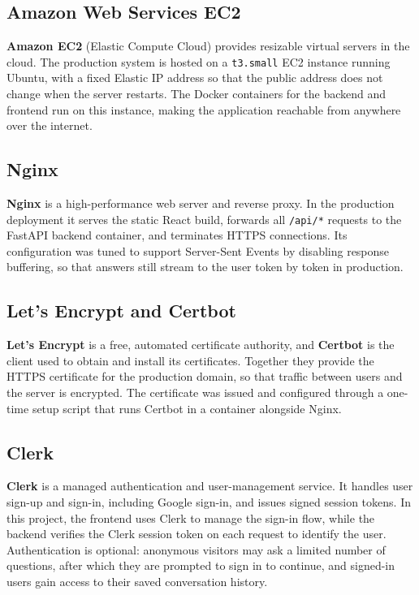 \subsection{Amazon Web Services EC2}
\textbf{Amazon EC2} (Elastic Compute Cloud) provides resizable virtual servers in the
cloud. The production system is hosted on a \texttt{t3.small} EC2 instance running Ubuntu,
with a fixed Elastic IP address so that the public address does not change when the server
restarts. The Docker containers for the backend and frontend run on this instance, making
the application reachable from anywhere over the internet.

\subsection{Nginx}
\textbf{Nginx} is a high-performance web server and reverse proxy. In the production
deployment it serves the static React build, forwards all \texttt{/api/*} requests to the
FastAPI backend container, and terminates HTTPS connections. Its configuration was tuned
to support Server-Sent Events by disabling response buffering, so that answers still
stream to the user token by token in production.

\subsection{Let's Encrypt and Certbot}
\textbf{Let's Encrypt} is a free, automated certificate authority, and \textbf{Certbot}
is the client used to obtain and install its certificates. Together they provide the
HTTPS certificate for the production domain, so that traffic between users and the server
is encrypted. The certificate was issued and configured through a one-time setup script
that runs Certbot in a container alongside Nginx.

\subsection{Clerk}
\textbf{Clerk} is a managed authentication and user-management service. It handles user
sign-up and sign-in, including Google sign-in, and issues signed session tokens. In this
project, the frontend uses Clerk to manage the sign-in flow, while the backend verifies
the Clerk session token on each request to identify the user. Authentication is optional:
anonymous visitors may ask a limited number of questions, after which they are prompted to
sign in to continue, and signed-in users gain access to their saved conversation history.

